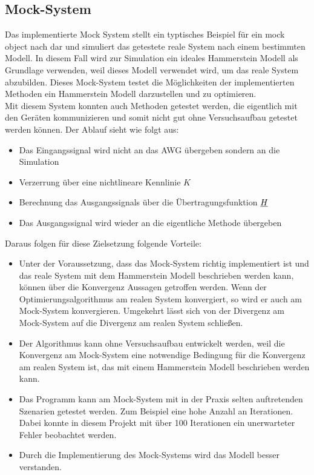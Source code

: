 \documentclass[../Report.tex]{subfiles}
\begin{document}
\subsection{Mock-System}
\label{subsec:code.mock}
Das implementierte Mock System stellt ein typtisches Beispiel für ein mock object nach \cite{mock} dar und simuliert das getestete reale System nach einem bestimmten Modell. In diesem Fall wird zur Simulation ein ideales Hammerstein Modell als Grundlage verwenden, weil dieses Modell verwendet wird, um das reale System abzubilden. Dieses Mock-System testet die Möglichkeiten der implementierten Methoden ein Hammerstein Modell darzustellen und zu optimieren.\\
Mit diesem System konnten auch Methoden getestet werden, die eigentlich mit den Geräten kommunizieren und somit nicht gut ohne Versuchsaufbau getestet werden können. Der Ablauf sieht wie folgt aus:
\begin{itemize}
	\item Das Eingangssignal wird nicht an das AWG übergeben sondern an die Simulation
	\item Verzerrung über eine nichtlineare Kennlinie $K$ 
	\item Berechnung das Ausgangssignals über die Übertragungsfunktion $\underline{H}$
	\item Das Ausgangssignal wird wieder an die eigentliche Methode übergeben
\end{itemize}
Daraus folgen für diese Zielsetzung folgende Vorteile:
\begin{itemize}
	\item Unter der Voraussetzung, dass das Mock-System richtig implementiert ist und das reale System mit dem Hammerstein Modell beschrieben werden kann, können über die Konvergenz Aussagen getroffen werden. Wenn der Optimierungsalgorithmus am realen System konvergiert, so wird er auch am Mock-System konvergieren. Umgekehrt lässt sich von der Divergenz am Mock-System auf die Divergenz am realen System schließen.
	\item Der Algorithmus kann ohne Versuchsaufbau entwickelt werden, weil die Konvergenz am Mock-System eine notwendige Bedingung für die Konvergenz am realen System ist, das mit einem Hammerstein Modell beschrieben werden kann.
	\item Das Programm kann am Mock-System mit in der Praxis selten auftretenden Szenarien getestet werden. Zum Beispiel eine hohe Anzahl an Iterationen. Dabei konnte in diesem Projekt mit über 100 Iterationen ein unerwarteter Fehler beobachtet werden.
	\item Durch die Implementierung des Mock-Systems wird das Modell besser verstanden.
\end{itemize}
\end{document}
